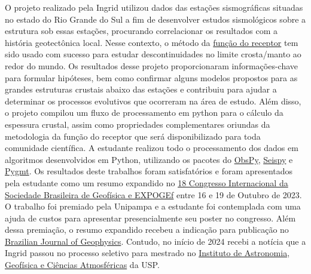 \documentclass[10pt,a4paper,oneside]{book}
\begin{document}
O projeto realizado pela Ingrid utilizou dados das estações sismográficas situadas no estado do Rio Grande do Sul a fim de desenvolver estudos sismológicos sobre a estrutura sob essas estações, procurando correlacionar os resultados com a história geotectônica local. Nesse contexto, o método da \href{http://eqseis.geosc.psu.edu/cammon/HTML/RftnDocs/rftn01.html#:~:text=Receiver\%20functions\%20are\%20time\%20series,Earth\%20structure\%20near\%20the\%20receiver}{função do receptor} tem sido usado com sucesso para estudar descontinuidades no limite crosta/manto ao redor do mundo. Os resultados desse projeto proporcionaram informações-chave para formular hipóteses, bem como confirmar alguns modelos propostos para as grandes estruturas crustais abaixo das estações e contribuiu para ajudar a determinar os processos evolutivos que ocorreram na área de estudo. Além disso, o projeto compilou um fluxo de processamento em python para o cálculo da espessura crustal, assim como propriedades complementares oriundas da metodologia da função do receptor que será disponibilizado para toda comunidade científica. A estudante realizou todo o processamento dos dados em algoritmos desenvolvidos em Python, utilizando os pacotes do \href{https://docs.obspy.org/}{ObsPy}, \href{https://seispy.xumijian.me/latest/}{Seispy} e \href{https://www.pygmt.org/latest/}{Pygmt}. Os resultados deste trabalhos foram satisfatórios e foram apresentados pela estudante como um resumo expandido no \href{https://sbgf.org.br/congresso/}{18 Congresso Internacional da Sociedade Brasileira de Geofísica e EXPOGEf} entre 16 e 19 de Outubro de 2023. O trabalho foi premiado pela Unipampa e a estudante foi contemplada com uma ajuda de custos para apresentar presencialmente seu poster no congresso. Além dessa premiação, o resumo expandido recebeu a indicação para publicação no \href{https://sbgf.org.br/revista/index.php/rbgf}{Brazilian Journal of Geophysics}. Contudo, no início de 2024 recebi a notícia que a Ingrid passou no processo seletivo para mestrado no \href{https://www.iag.usp.br/}{Instituto de Astronomia, Geofísica e Ciências Atmosféricas} da USP.
\end{document}
